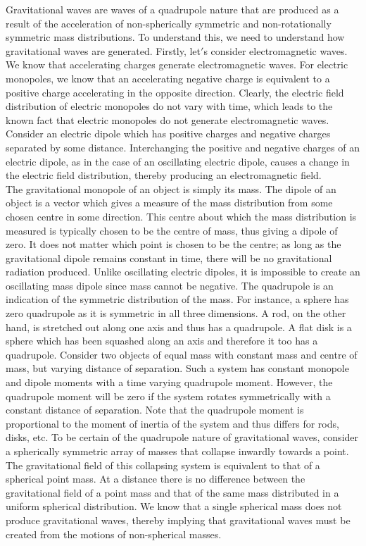 \documentclass[12pt]{article}
\begin{document}
	\noindent Gravitational waves are waves of a quadrupole nature that are produced as a result of the acceleration of non-spherically symmetric and non-rotationally symmetric mass distributions. To understand this, we need to understand how gravitational waves are generated. Firstly, let$'$s consider electromagnetic waves. We know that accelerating charges generate electromagnetic waves. For electric monopoles, we know that an accelerating negative charge is equivalent to a positive charge accelerating in the opposite direction. Clearly, the electric field distribution of electric monopoles do not vary with time, which leads to the known fact that electric monopoles do not generate electromagnetic waves. Consider an electric dipole which has positive charges and negative charges separated by some distance. Interchanging the positive and negative charges of an electric dipole, as in the case of an oscillating electric dipole, causes a change in the electric field distribution, thereby producing an electromagnetic field.\\ 
	\noindent The gravitational monopole of an object is simply its mass. The dipole of an object is a vector which gives a measure of the mass distribution from some chosen centre in some direction. This centre about which the mass distribution is measured is typically chosen to be the centre of mass, thus giving a dipole of zero. It does not matter which point is chosen to be the centre; as long as the gravitational dipole remains constant in time, there will be no gravitational radiation produced. Unlike oscillating electric dipoles, it is impossible to create an oscillating mass dipole since mass cannot be negative. The quadrupole is an indication of the symmetric distribution of the mass. For instance, a sphere has zero quadrupole as it is symmetric in all three dimensions. A rod, on the other hand, is stretched out along one axis and thus has a quadrupole. A flat disk is a sphere which has been squashed along an axis and therefore it too has a quadrupole. Consider two objects of equal mass with constant mass and centre of mass, but varying distance of separation. Such a system has constant monopole and dipole moments with a time varying quadrupole moment. However, the quadrupole moment will be zero if the system rotates symmetrically with a constant distance of separation. Note that the quadrupole moment is proportional to the moment of inertia of the system and thus differs for rods, disks, etc. To be certain of the quadrupole nature of gravitational waves, consider a spherically symmetric array of masses that collapse inwardly towards a point. The gravitational field of this collapsing system is equivalent to that of a spherical point mass. At a distance there is no difference between the gravitational field of a point mass and that of the same mass distributed in a uniform spherical distribution. We know that a single spherical mass does not produce gravitational waves, thereby implying that gravitational waves must be created from the motions of non-spherical masses.
\end{document}
